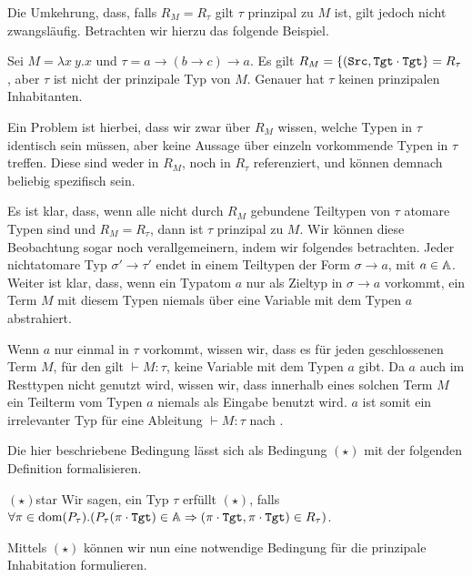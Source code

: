 Die Umkehrung, dass, falls $R_M = R_\tau$ gilt $\tau$ prinzipal zu $M$ ist, gilt jedoch nicht zwangsläufig. Betrachten wir hierzu das folgende Beispiel.

\begin{example}{}{}
    Sei $M=\lambda x~y.x$ und $\tau = a\to(b\to c)\to a$. Es gilt $R_M = \{(\texttt{Src},\texttt{Tgt}\cdot\texttt{Tgt}\} = R_\tau$, aber $\tau$ ist nicht der prinzipale Typ von $M$. Genauer hat $\tau$ keinen prinzipalen Inhabitanten.
\end{example}

Ein Problem ist hierbei, dass wir zwar über $R_M$ wissen, welche Typen in $\tau$ identisch sein müssen, aber keine Aussage über einzeln vorkommende Typen in $\tau$ treffen. Diese sind weder in $R_M$, noch in $R_\tau$ referenziert, und können demnach beliebig spezifisch sein.

Es ist klar, dass, wenn alle nicht durch $R_M$ gebundene Teiltypen von $\tau$ atomare Typen sind und $R_M = R_\tau$, dann ist $\tau$ prinzipal zu $M$. Wir können diese Beobachtung sogar noch verallgemeinern, indem wir folgendes betrachten. Jeder nichtatomare Typ $\sigma'\to\tau'$ endet in einem Teiltypen der Form $\sigma\to a$, mit $a\in\mathbb{A}$. Weiter ist klar, dass, wenn ein Typatom $a$ nur als Zieltyp in $\sigma\to a$ vorkommt, ein Term $M$ mit diesem Typen niemals über eine Variable mit dem Typen $a$ abstrahiert.

Wenn $a$ nur einmal in $\tau$ vorkommt, wissen wir, dass es für jeden geschlossenen Term $M$, für den gilt $\vdash M: \tau$, keine Variable mit dem Typen $a$ gibt. Da $a$ auch im Resttypen nicht genutzt wird, wissen wir, dass innerhalb eines solchen Term $M$ ein Teilterm vom Typen $a$ niemals als Eingabe benutzt wird. $a$ ist somit ein irrelevanter Typ für eine Ableitung $\vdash M : \tau$ nach .

Die hier beschriebene Bedingung lässt sich als Bedingung $(\star)$ mit der folgenden Definition formalisieren.

\begin{definition}{$(\star)$}{star}
    Wir sagen, ein Typ $\tau$ erfüllt $(\star)$, falls $\forall \pi\in\text{dom}(P_\tau).(P_\tau(\pi\cdot\texttt{Tgt})\in\mathbb{A}\Rightarrow (\pi\cdot\texttt{Tgt},\pi\cdot\texttt{Tgt})\in R_\tau)$.
\end{definition}

Mittels $(\star)$ können wir nun eine notwendige Bedingung für die prinzipale Inhabitation formulieren.

